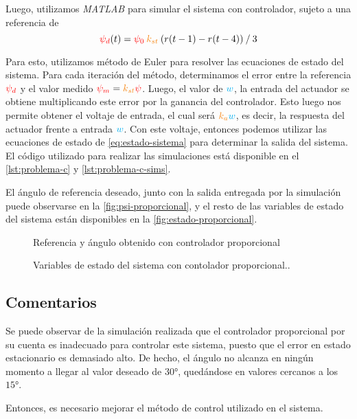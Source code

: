 Luego, utilizamos \textit{MATLAB} para simular el sistema con controlador, sujeto
a una referencia de
\begin{equation}
	\rojo{\psi_{d}}(t) = \rojo{\psi_{0}}\nara{k_{st}}\left(r(t-1) - r(t-4)\right) \mathbin{/} 3
\end{equation}

Para esto, utilizamos método de Euler para resolver las ecuaciones de estado
del sistema. Para cada iteración del método, determinamos el error entre la
referencia $\mathbin{\color{red}\psi_{d}}$ y el valor medido $\rojo{\psi_{m}} = \nara{k_{st}}\rojo{\psi}$.
Luego, el valor de $\mathbin{\color{cyan}w}$, la entrada del actuador se obtiene multiplicando
este error por la ganancia del controlador. Esto luego nos permite obtener el
voltaje de entrada, el cual será $\nara{k_{a}}\azul{w}$, es decir, la respuesta del
actuador frente a entrada $\mathbin{\color{cyan}w}$. Con este voltaje, entonces podemos utilizar
las ecuaciones de estado de \eqref{eq:estado-sistema} para determinar la salida del
sistema. El código utilizado para realizar las simulaciones está disponible en
el \autoref{lst:problema-c} y \autoref{lst:problema-c-sims}.

El ángulo de referencia deseado, junto con la salida entregada por la simulación
puede observarse en la \autoref{fig:psi-proporcional}, y el resto de las variables
de estado del sistema están disponibles en la \autoref{fig:estado-proporcional}.

\begin{figure}[h]
  \centering
  
  \caption{Referencia y ángulo obtenido con controlador proporcional}\label{fig:psi-proporcional}
\end{figure}

\begin{figure}[h]
  \centering
  
  \caption{Variables de estado del sistema con contolador proporcional..}\label{fig:estado-proporcional}
\end{figure}

\subsection{Comentarios}

Se puede observar de la simulación realizada que el controlador proporcional por
su cuenta es inadecuado para controlar este sistema, puesto que el error en estado
estacionario es demasiado alto. De hecho, el ángulo no alcanza en ningún momento
a llegar al valor deseado de $\ang{30}$, quedándose en valores cercanos a los $\ang{15}$.

Entonces, es necesario mejorar el método de control utilizado en el sistema.
